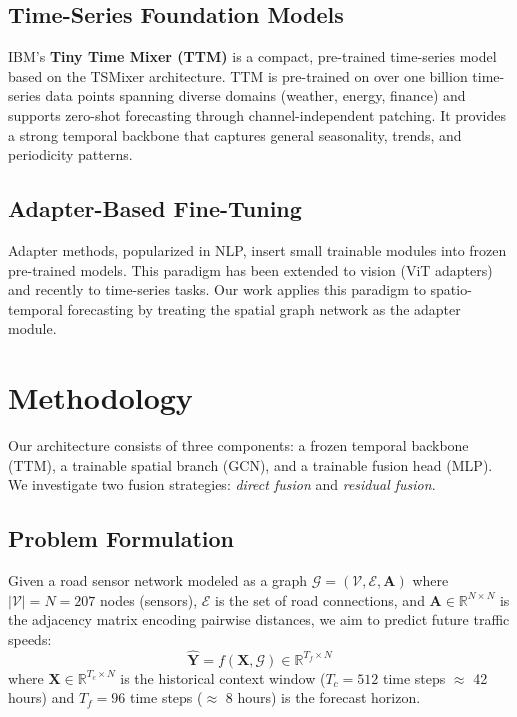 \documentclass[11pt, a4paper]{article}
\begin{document}
\subsection{Time-Series Foundation Models}

IBM's \textbf{Tiny Time Mixer (TTM)} \cite{ttm} is a compact, pre-trained time-series model based on the TSMixer architecture. TTM is pre-trained on over one billion time-series data points spanning diverse domains (weather, energy, finance) and supports zero-shot forecasting through channel-independent patching. It provides a strong temporal backbone that captures general seasonality, trends, and periodicity patterns.

\subsection{Adapter-Based Fine-Tuning}

Adapter methods, popularized in NLP, insert small trainable modules into frozen pre-trained models. This paradigm has been extended to vision (ViT adapters) and recently to time-series tasks. Our work applies this paradigm to spatio-temporal forecasting by treating the spatial graph network as the adapter module.

\section{Methodology}
\label{sec:method}

Our architecture consists of three components: a frozen temporal backbone (TTM), a trainable spatial branch (GCN), and a trainable fusion head (MLP). We investigate two fusion strategies: \textit{direct fusion} and \textit{residual fusion}.

\subsection{Problem Formulation}

Given a road sensor network modeled as a graph $\mathcal{G} = (\mathcal{V}, \mathcal{E}, \mathbf{A})$ where $|\mathcal{V}| = N = 207$ nodes (sensors), $\mathcal{E}$ is the set of road connections, and $\mathbf{A} \in \mathbb{R}^{N \times N}$ is the adjacency matrix encoding pairwise distances, we aim to predict future traffic speeds:
\begin{equation}
    \hat{\mathbf{Y}} = f(\mathbf{X}, \mathcal{G}) \in \mathbb{R}^{T_f \times N}
\end{equation}
where $\mathbf{X} \in \mathbb{R}^{T_c \times N}$ is the historical context window ($T_c = 512$ time steps $\approx$ 42 hours) and $T_f = 96$ time steps ($\approx$ 8 hours) is the forecast horizon.
\end{document}
